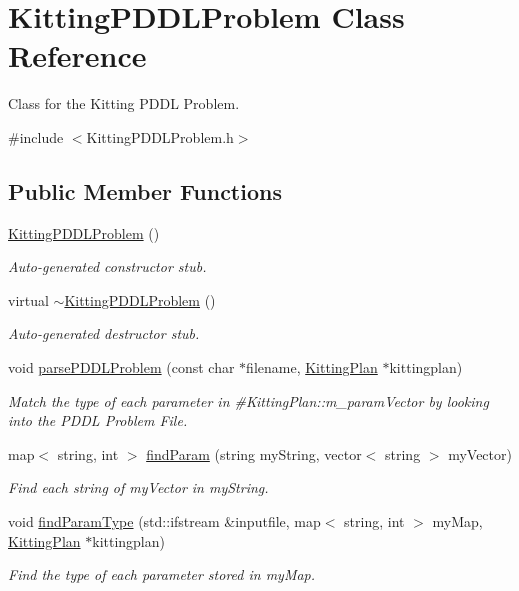 \hypertarget{class_kitting_p_d_d_l_problem}{
\section{KittingPDDLProblem Class Reference}
\label{class_kitting_p_d_d_l_problem}
}


Class for the Kitting PDDL Problem.  




{\ttfamily \#include $<$KittingPDDLProblem.h$>$}

\subsection*{Public Member Functions}
\begin{DoxyCompactItemize}
\item 
\hyperlink{class_kitting_p_d_d_l_problem_ade618a96fbb030afb5799aee07f4beee}{KittingPDDLProblem} ()
\begin{DoxyCompactList}\small\item\em Auto-\/generated constructor stub. \item\end{DoxyCompactList}\item 
virtual \hyperlink{class_kitting_p_d_d_l_problem_ae976b542c4d2b810828caffae0725e07}{$\sim$KittingPDDLProblem} ()
\begin{DoxyCompactList}\small\item\em Auto-\/generated destructor stub. \item\end{DoxyCompactList}\item 
void \hyperlink{class_kitting_p_d_d_l_problem_ab3d83970ecca959e48915bd91104769c}{parsePDDLProblem} (const char $\ast$filename, \hyperlink{class_kitting_plan}{KittingPlan} $\ast$kittingplan)
\begin{DoxyCompactList}\small\item\em Match the type of each parameter in \#KittingPlan::m\_\-paramVector by looking into the PDDL Problem File. \item\end{DoxyCompactList}\item 
map$<$ string, int $>$ \hyperlink{class_kitting_p_d_d_l_problem_a2eb5cc63c06fdd8e9dbce89f0d41ea39}{findParam} (string myString, vector$<$ string $>$ myVector)
\begin{DoxyCompactList}\small\item\em Find each string of {\itshape myVector\/} in {\itshape myString\/}. \item\end{DoxyCompactList}\item 
void \hyperlink{class_kitting_p_d_d_l_problem_a1245b5005d07692b023432015ee41bd3}{findParamType} (std::ifstream \&inputfile, map$<$ string, int $>$ myMap, \hyperlink{class_kitting_plan}{KittingPlan} $\ast$kittingplan)
\begin{DoxyCompactList}\small\item\em Find the type of each parameter stored in {\itshape myMap\/}. \item\end{DoxyCompactList}\end{DoxyCompactItemize}
